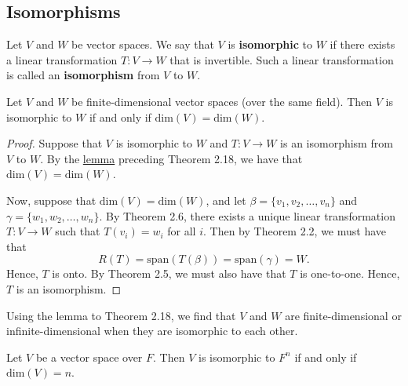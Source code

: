 \subsection{Isomorphisms}

\begin{definition}[Isomorphisms]
   Let \( V  \) and \( W  \) be vector spaces. We say that \( V  \) is \textbf{isomorphic} to \( W  \) if there exists a linear transformation \( T: V \to W  \) that is invertible. Such a linear transformation is called an \textbf{isomorphism} from \( V  \) to \( W  \). 
\end{definition}

\begin{theorem}
   Let \( V  \) and \( W  \) be finite-dimensional vector spaces (over the same field). Then \( V  \) is isomorphic to \( W  \) if and only if \( \text{dim}(V) = \text{dim}(W) \).  
\end{theorem}
\begin{proof}
    Suppose that \( V  \) is isomorphic to \( W  \) and \( T: V \to W  \) is an isomorphism from \( V  \) to \( W  \). By the {\hyperref[Invertibility Implies dim V = dim W]{lemma}} preceding Theorem 2.18, we have that \( \text{dim}(V) = \text{dim}(W) \).

    Now, suppose that \( \text{dim}(V) = \text{dim}(W) \), and let \( \beta = \{ {v}_{1}, {v}_{2}, \dots, {v}_{n} \} \) and \( \gamma = \{ {w}_{1}, {w}_{2}, \dots, {w}_{n} \}  \). By Theorem 2.6, there exists a unique linear transformation \( T: V \to W  \) such that \( T({v}_{i}) = {w}_{i} \) for all \( i \). Then by Theorem 2.2, we must have that 
    \[  R(T) = \text{span}(T(\beta)) = \text{span}(\gamma) = W. \]
    Hence, \( T  \) is onto. By Theorem 2.5, we must also have that \( T  \) is one-to-one. Hence, \( T  \) is an isomorphism.
\end{proof}

\begin{remark}
    Using the lemma to Theorem 2.18, we find that \( V  \) and \( W  \) are finite-dimensional or infinite-dimensional when they are isomorphic to each other.  
\end{remark}

\begin{corollary}
    Let \( V  \) be a vector space over \( F  \). Then \( V  \) is isomorphic to \( F^{n}  \) if and only if \( \text{dim}(V) = n  \).
\end{corollary}

